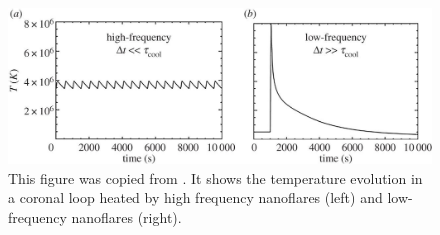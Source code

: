 \begin{figure}
    \centering
    \includegraphics[width=\textwidth]{figures/introduction/klimchuck_temperature.jpg}
    \vspace{-20pt}
    \caption{This figure was copied from \citet{Klimchuk2015}. It shows the temperature evolution in a coronal loop heated by high frequency nanoflares (left) and low-frequency nanoflares (right).}
    \label{fig:klimchuck_temperature}
\end{figure}

